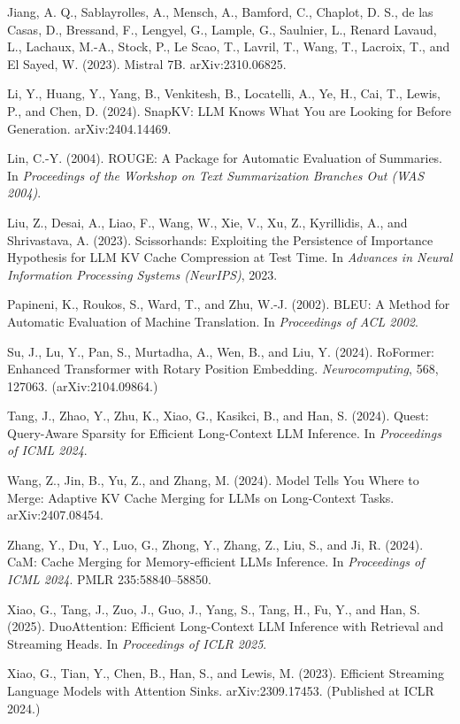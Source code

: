 \documentclass[10pt,letterpaper]{article}
\begin{document}
Jiang, A. Q., Sablayrolles, A., Mensch, A., Bamford, C., Chaplot, D. S.,
de las Casas, D., Bressand, F., Lengyel, G., Lample, G., Saulnier, L.,
Renard Lavaud, L., Lachaux, M.-A., Stock, P., Le Scao, T., Lavril, T.,
Wang, T., Lacroix, T., and El Sayed, W. (2023). Mistral 7B.
arXiv:2310.06825.

Li, Y., Huang, Y., Yang, B., Venkitesh, B., Locatelli, A., Ye, H., Cai,
T., Lewis, P., and Chen, D. (2024). SnapKV: LLM Knows What You are
Looking for Before Generation. arXiv:2404.14469.

Lin, C.-Y. (2004). ROUGE: A Package for Automatic Evaluation of
Summaries. In \emph{Proceedings of the Workshop on Text Summarization
Branches Out (WAS 2004)}.

Liu, Z., Desai, A., Liao, F., Wang, W., Xie, V., Xu, Z., Kyrillidis, A.,
and Shrivastava, A. (2023). Scissorhands: Exploiting the Persistence of
Importance Hypothesis for LLM KV Cache Compression at Test Time. In
\emph{Advances in Neural Information Processing Systems (NeurIPS)},
2023.

Papineni, K., Roukos, S., Ward, T., and Zhu, W.-J. (2002). BLEU: A
Method for Automatic Evaluation of Machine Translation. In
\emph{Proceedings of ACL 2002}.

Su, J., Lu, Y., Pan, S., Murtadha, A., Wen, B., and Liu, Y. (2024).
RoFormer: Enhanced Transformer with Rotary Position Embedding.
\emph{Neurocomputing}, 568, 127063. (arXiv:2104.09864.)

Tang, J., Zhao, Y., Zhu, K., Xiao, G., Kasikci, B., and Han, S. (2024).
Quest: Query-Aware Sparsity for Efficient Long-Context LLM Inference. In
\emph{Proceedings of ICML 2024}.

Wang, Z., Jin, B., Yu, Z., and Zhang, M. (2024). Model Tells You Where
to Merge: Adaptive KV Cache Merging for LLMs on Long-Context Tasks.
arXiv:2407.08454.

Zhang, Y., Du, Y., Luo, G., Zhong, Y., Zhang, Z., Liu, S., and Ji, R.
(2024). CaM: Cache Merging for Memory-efficient LLMs Inference. In
\emph{Proceedings of ICML 2024}. PMLR 235:58840--58850.

Xiao, G., Tang, J., Zuo, J., Guo, J., Yang, S., Tang, H., Fu, Y., and
Han, S. (2025). DuoAttention: Efficient Long-Context LLM Inference with
Retrieval and Streaming Heads. In \emph{Proceedings of ICLR 2025}.

Xiao, G., Tian, Y., Chen, B., Han, S., and Lewis, M. (2023). Efficient
Streaming Language Models with Attention Sinks. arXiv:2309.17453.
(Published at ICLR 2024.)
\end{document}
